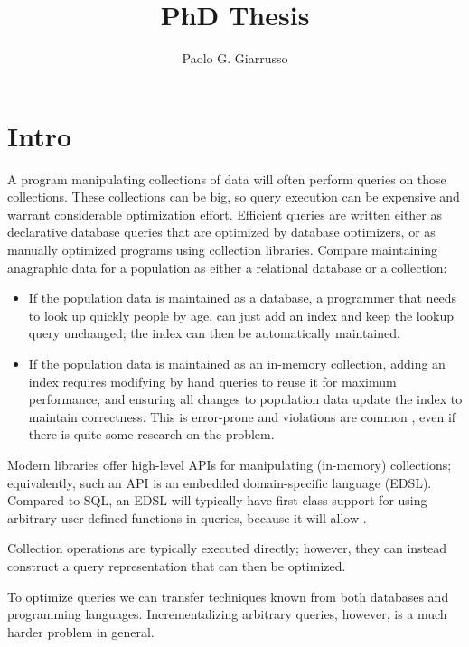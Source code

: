 \documentclass{book}
\title{PhD Thesis}
\author{Paolo G. Giarrusso}
\begin{document}
\maketitle
\chapter{Intro}

A program manipulating collections of data will often perform queries on those
collections. These collections can be big, so query execution can be expensive
and warrant considerable optimization effort.
Efficient queries are written either as declarative database queries that are
optimized by database optimizers, or as manually optimized programs using
collection libraries. Compare maintaining anagraphic data for a population
as either a relational database or a collection:
\begin{itemize}
\item If the population data is maintained as a database, a programmer that needs to
  look up quickly people by age, can just add an index and keep the lookup query
  unchanged; the index can then be automatically maintained.
\item If the population data is maintained as an in-memory collection, adding an
  index requires modifying by hand queries to reuse it for maximum performance,
  and ensuring all changes to population data update the index to maintain
  correctness. This is error-prone and violations are common , even if
  there is quite some research on the problem.
\end{itemize}
Modern libraries offer high-level APIs for manipulating (in-memory) collections;
equivalently, such an API is an embedded domain-specific language (EDSL).
Compared to SQL, an EDSL will typically have first-class support for using
arbitrary user-defined functions in queries, because it will allow .


Collection operations are typically executed directly; however, they can instead
construct a query representation that can then be optimized.

To optimize queries we can transfer techniques known from both databases and
programming languages. Incrementalizing arbitrary queries, however, is a much
harder problem in general.
\end{document}
